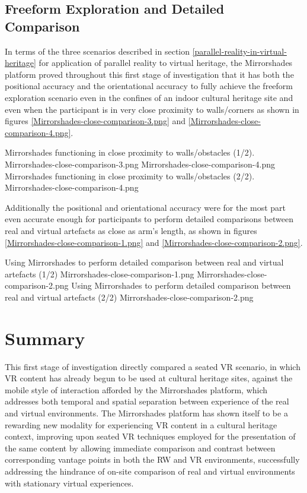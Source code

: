 
\subsection{Freeform Exploration and Detailed Comparison}

In terms of the three scenarios described in section \ref{parallel-reality-in-virtual-heritage} for application of parallel reality to virtual heritage, the Mirrorshades platform proved throughout this first stage of investigation that it has both the positional accuracy and the orientational accuracy to fully achieve the freeform exploration scenario even in the confines of an indoor cultural heritage site and even when the participant is in very close proximity to walls/corners as shown in figures \ref{Mirrorshades-close-comparison-3.png} and \ref{Mirrorshades-close-comparison-4.png}.

 {Mirrorshades functioning in close proximity to walls/obstacles (1/2).} {Mirrorshades-close-comparison-3.png}
       {Mirrorshades-close-comparison-4.png} {Mirrorshades functioning in close proximity to walls/obstacles (2/2).} {Mirrorshades-close-comparison-4.png}

Additionally the positional and orientational accuracy were for the most part even accurate enough for participants to perform detailed comparisons between real and virtual artefacts as close as arm's length, as shown in figures \ref{Mirrorshades-close-comparison-1.png} and \ref{Mirrorshades-close-comparison-2.png}.

 {Using Mirrorshades to perform detailed comparison between real and virtual artefacts (1/2)} {Mirrorshades-close-comparison-1.png}
       {Mirrorshades-close-comparison-2.png} {Using Mirrorshades to perform detailed comparison between real and virtual artefacts (2/2)} {Mirrorshades-close-comparison-2.png}


\section{Summary}

This first stage of investigation directly compared a seated VR scenario, in which VR content has already begun to be used at cultural heritage sites, against the mobile style of interaction afforded by the Mirrorshades platform, which addresses both temporal and spatial separation between experience of the real and virtual environments. The Mirrorshades platform has shown itself to be a rewarding new modality for experiencing VR content in a cultural heritage context, improving upon seated VR techniques employed for the presentation of the same content by allowing immediate comparison and contrast between corresponding vantage points in both the RW and VR environments, successfully addressing the hindrance of on-site comparison of real and virtual environments with stationary virtual experiences.

